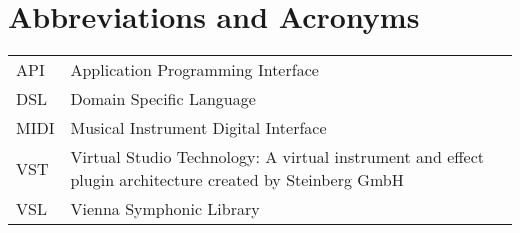 \chapter*{Abbreviations and Acronyms}


\noindent
\begin{longtable}{@{}p{}p{}@{}}
API & Application Programming Interface \\
DSL & Domain Specific Language \\
MIDI & Musical Instrument Digital Interface \\
VST & Virtual Studio Technology: A virtual instrument and effect plugin architecture created by Steinberg GmbH \\
VSL & Vienna Symphonic Library

\end{longtable}
